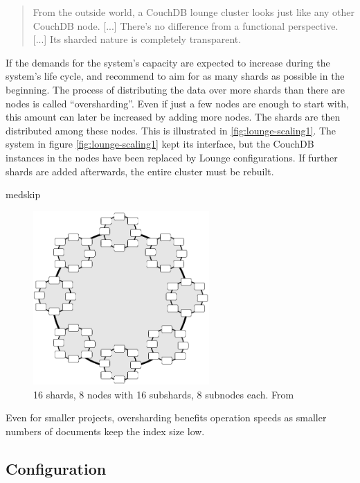 \begin{quote}
From the outside world, a CouchDB lounge cluster looks just like any other CouchDB node. [...] There's no difference from a functional perspective. [...] Its sharded nature is completely transparent. \cite{lounge:blogpost}
\end{quote}

If the demands for the system's capacity are expected to increase during the system's life cycle,  and \cite{lounge:till} recommend to aim for as many shards as possible in the beginning. The process of distributing the data over more shards than there are nodes is called \enquote{oversharding}. Even if just a few nodes are enough to start with, this amount can later be increased by adding more nodes. The shards are then distributed among these nodes. This is illustrated in \ref{fig:lounge-scaling1}. The system in figure \ref{fig:lounge-scaling1} kept its interface, but the CouchDB instances in the nodes have been replaced by Lounge configurations. If further shards are added afterwards, the entire cluster must be rebuilt.

medskip
\begin{figure}[H] 
  \begin{center}
    \includegraphics[width=0.6\textwidth]{grafik/shards2} 
  \end{center}
  \caption[16 shards, 8 nodes with 16 subshards, 8 subnodes each]{16 shards, 8 nodes with 16 subshards, 8 subnodes each. From }
  \label{fig:lounge-scaling2} 
\end{figure}

Even for smaller projects, oversharding benefits operation speeds as smaller numbers of documents keep the index size low.

\subsection{Configuration}
\label{subsec:lounge-install}

